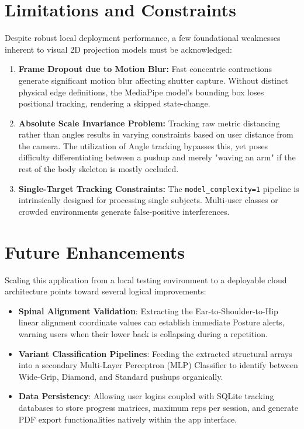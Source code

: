 \documentclass[12pt, a4paper]{article}
\begin{document}
\section{Limitations and Constraints}
Despite robust local deployment performance, a few foundational weaknesses inherent to visual 2D projection models must be acknowledged:
\begin{enumerate}
    \item \textbf{Frame Dropout due to Motion Blur:} Fast concentric contractions generate significant motion blur affecting shutter capture. Without distinct physical edge definitions, the MediaPipe model's bounding box loses positional tracking, rendering a skipped state-change.
    \item \textbf{Absolute Scale Invariance Problem:} Tracking raw metric distancing rather than angles results in varying constraints based on user distance from the camera. The utilization of Angle tracking bypasses this, yet poses difficulty differentiating between a pushup and merely "waving an arm" if the rest of the body skeleton is mostly occluded.
    \item \textbf{Single-Target Tracking Constraints:} The \texttt{model\_complexity=1} pipeline is intrinsically designed for processing single subjects. Multi-user classes or crowded environments generate false-positive interferences. 
\end{enumerate}


\section{Future Enhancements}
Scaling this application from a local testing environment to a deployable cloud architecture points toward several logical improvements:
\begin{itemize}
    \item \textbf{Spinal Alignment Validation}: Extracting the Ear-to-Shoulder-to-Hip linear alignment coordinate values can establish immediate Posture alerts, warning users when their lower back is collapsing during a repetition.
    \item \textbf{Variant Classification Pipelines}: Feeding the extracted structural arrays into a secondary Multi-Layer Perceptron (MLP) Classifier to identify between Wide-Grip, Diamond, and Standard pushups organically.
    \item \textbf{Data Persistency}: Allowing user logins coupled with SQLite tracking databases to store progress matrices, maximum reps per session, and generate PDF export functionalities natively within the app interface.
\end{itemize}
\end{document}
